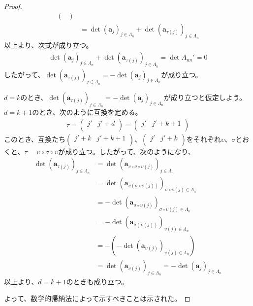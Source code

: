 \documentclass[dvipdfmx]{jsarticle}
\begin{document}
\begin{proof}
\begin{align*}
\begin{pmatrix}
\end{pmatrix}\\
&= \det\left( \mathbf{a}_{j} \right)_{j \in \varLambda_{n}} + \det\left( \mathbf{a}_{\tau(j)} \right)_{j \in \varLambda_{n}}
\end{align*}
以上より、次式が成り立つ。
\begin{align*}
\det\left( \mathbf{a}_{j} \right)_{j \in \varLambda_{n}} + \det\left( \mathbf{a}_{\tau(j)} \right)_{j \in \varLambda_{n}} = \det A_{nn}' = 0
\end{align*}
したがって、$\det\left( \mathbf{a}_{\tau(j)} \right)_{j \in \varLambda_{n}} = - \det\left( \mathbf{a}_{j} \right)_{j \in \varLambda_{n}}$が成り立つ。\par
$d = k$のとき、$\det\left( \mathbf{a}_{\tau(j)} \right)_{j \in \varLambda_{n}} = - \det\left( \mathbf{a}_{j} \right)_{j \in \varLambda_{n}}$が成り立つと仮定しよう。$d = k + 1$のとき、次のように互換を定める。
\begin{align*}
\tau = \begin{pmatrix}
j' & j' + d \\
\end{pmatrix} = \begin{pmatrix}
j' & j' + k + 1 \\
\end{pmatrix}
\end{align*}
このとき、互換たち$\begin{pmatrix}
j' + k & j' + k + 1 \\
\end{pmatrix}$、$\begin{pmatrix}
j' & j' + k \\
\end{pmatrix}$をそれぞれ$\upsilon$、$\sigma$とおくと、$\tau = \upsilon \circ \sigma \circ \upsilon$が成り立つ。したがって、次のようになり、
\begin{align*}
\det\left( \mathbf{a}_{\tau(j)} \right)_{j \in \varLambda_{n}} &= \det\left( \mathbf{a}_{\upsilon \circ \sigma \circ \upsilon(j)} \right)_{j \in \varLambda_{n}}\\
&= \det\left( \mathbf{a}_{\upsilon\left( \sigma \circ \upsilon(j) \right)} \right)_{\sigma \circ \upsilon(j) \in \varLambda_{n}}\\
&= - \det\left( \mathbf{a}_{\sigma \circ \upsilon(j)} \right)_{\sigma \circ \upsilon(j) \in \varLambda_{n}}\\
&= - \det\left( \mathbf{a}_{\sigma\left( \upsilon(j) \right)} \right)_{\upsilon(j) \in \varLambda_{n}}\\
&= - \left( - \det\left( \mathbf{a}_{\upsilon(j)} \right)_{\upsilon(j) \in \varLambda_{n}} \right)\\
&= \det\left( \mathbf{a}_{\upsilon(j)} \right)_{j \in \varLambda_{n}} = - \det\left( \mathbf{a}_{j} \right)_{j \in \varLambda_{n}}
\end{align*}
以上より、$d = k + 1$のときも成り立つ。\par
よって、数学的帰納法によって示すべきことは示された。
\end{proof}
\end{document}
